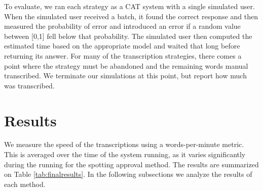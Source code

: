 \documentclass[ms,electronic,twosidetoc,letterpaper,chaptercenter,parttop,lof,lot]{byumsphd}
\begin{document}
To evaluate, we ran each strategy as a CAT system with a single simulated user. When the simulated user received a batch, it found the correct response and then measured the probability of error and introduced an error if a random value between [0,1] fell below that probability. The simulated user then computed the estimated time based on the appropriate model and waited that long before returning its answer. For many of the transcription strategies, there comes a point where the strategy must be abandoned and the remaining words manual transcribed. We terminate our simulations at this point, but report how much was transcribed.

\section{Results}

We measure the speed of the transcriptions using a words-per-minute metric. This is averaged over the time of the system running, as it varies significantly during the running for the spotting approval method. The results are summarized on Table \ref{tab:finalresults}. In the following subsections we analyze the results of each method.
\end{document}
